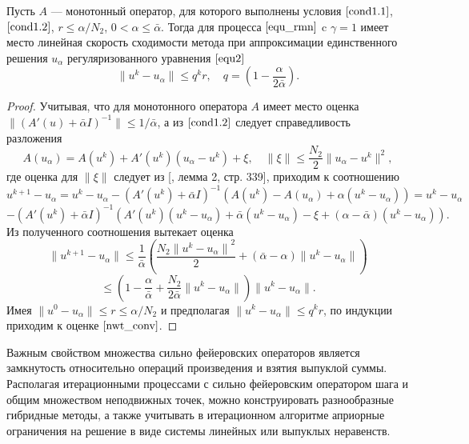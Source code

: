 \begin{theorem}\label{teo2.1} Пусть $A$ --- монотонный оператор, для которого выполнены условия $\eqref{cond1.1}$, $\eqref{cond1.2}$, $r\le \alpha/N_2$, $0<\alpha \le \bar\alpha$. Тогда для процесса $\eqref{equ_rmn}$ c $\gamma=1$ имеет место линейная скорость сходимости метода при аппроксимации единственного решения $u_\alpha$ регуляризованного уравнения $\eqref{equ2}$
	\begin{equation}\label{nwt_conv}
	\| u^k-u_\alpha \| \le q^kr, \quad q=(1-\frac{\alpha}{2\bar\alpha}).
	\end{equation}
\end{theorem}
\begin{proof} 
Учитывая, что для монотонного оператора $A$ имеет место оценка $\| (A'(u)+\bar\alpha I)^{-1} \| \le 1/\bar\alpha$, а из $\eqref{cond1.2}$ следует справедливость разложения
$$
A(u_\alpha)=A(u^k)+A'(u^k)(u_\alpha-u^k)+\xi, \quad \|\xi\|\le \frac{N_2}{2}\|u_\alpha-u^k\|^2,
$$
где оценка для $\|\xi\|$ следует из [\cite{Tre1993}, лемма 2, стр. 339], приходим к соотношению 
$$
u^{k+1}-u_\alpha=u^k-u_\alpha-(A'(u^k)+\bar\alpha I)^{-1}(A(u^k)-A(u_\alpha)+\alpha(u^k-u_\alpha))=u^k- u_\alpha$$ $$-(A'(u^k)+\bar\alpha I)^{-1}(A'(u^k)(u^k-u_\alpha)+\bar\alpha(u^k-u_\alpha)-\xi+(\alpha-\bar\alpha)(u^k-u_\alpha)). $$
Из полученного соотношения вытекает оценка
$$
\|u^{k+1}-u_\alpha\|\le\frac{1}{\bar\alpha}\left(\frac{N_2{\|u^{k}-u_\alpha\|}^2}{2}+(\bar\alpha-\alpha)\|u^k-u_\alpha\|\right)$$
$$\le\left(1-\frac{\alpha}{\bar\alpha}+\frac{N_2}{2\bar\alpha}\|u^k-u_\alpha\|\right)\|u^k-u_\alpha\|.$$
Имея $\|u^0-u_\alpha\|\le r \le \alpha/N_2$ и предполагая $\| u^{k}-u_\alpha \|\le q^kr$, по индукции приходим к оценке $\eqref{nwt_conv}$.
\end{proof}

Важным свойством множества сильно фейеровских операторов является замкнутость относительно операций произведения и взятия выпуклой суммы. Располагая итерационными процессами с сильно фейеровским оператором шага и общим множеством неподвижных точек, можно конструировать разнообразные гибридные методы, а также учитывать в итерационном алгоритме априорные ограничения на решение в виде системы линейных или выпуклых неравенств.

